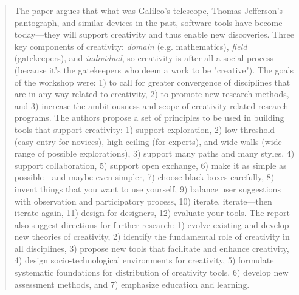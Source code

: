 		\begin{quote}
		\small
		The paper argues that what was Galileo's telescope, Thomas Jefferson's pantograph, 
		and similar devices in the past,
		software tools have become today---they will support creativity and thus enable new discoveries.
		Three key components of creativity: {\em domain} (e.g. mathematics),
		{\em field} (gatekeepers), and {\em individual}, so creativity is after all a social process
		(because it's the gatekeepers who deem a work to be "creative").
		The goals of the workshop were:
		1) to call for greater convergence of disciplines that are in any way related to creativity,
		2) to promote new research methods, and
		3) increase the ambitiousness and scope of creativity-related research programs.
		The authors propose a set of principles to be used in building tools that support creativity: 
		1) support exploration,
		2) low threshold (easy entry for novices), high ceiling (for experts), and wide walls (wide range
		of possible explorations), 
		3) support many paths and many styles, 
		4) support collaboration, 
		5) support open exchange, 
		6) make it as simple as possible---and maybe even simpler,
		7) choose black boxes carefully,
		8) invent things that you want to use yourself,
		9) balance user suggestions with observation and participatory process,
		10) iterate, iterate---then iterate again,
		11) design for designers,
		12) evaluate your tools.
		The report also suggest directions for further research: 
		1) evolve existing and develop new theories of creativity,
		2) identify the fundamental role of creativity in all disciplines,
		3) propose new tools that facilitate and enhance creativity,
		4) design socio-technological environments for creativity,
		5) formulate systematic foundations for distribution of creativity tools,
		6) develop new assessment methods, and
		7) emphasize education and learning.
		\end{quote}		

		
